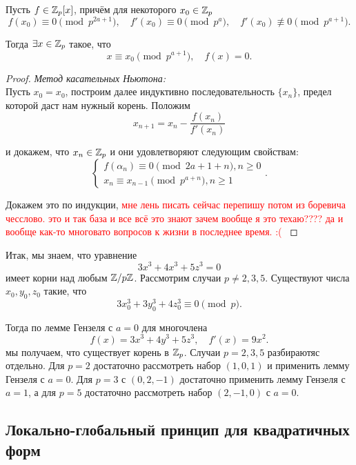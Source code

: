 	 \begin{lemma} 
	 	Пусть $f \in \mathbb{Z}_{p}[x]$, причём  для некоторого $x_0 \in \mathbb{Z}_{p}$
	 	\[
	 		f(x_0) \equiv 0 \pmod{p^{2a + 1}}, \quad f'(x_0) \equiv 0 \pmod{p^{a}}, \quad f'(x_0) \not\equiv 0 \pmod{p^{a + 1}}.
	 	\]

	 	Тогда $\exists x \in \mathbb{Z}_{p}$ такое, что \tabularnewline
	 	\[
	 		x \equiv x_0 \pmod{p^{a + 1}}, \quad f(x) = 0.
	 	\]
	 \end{lemma}

	 \begin{proof}
	 	\emph{Метод касательных Ньютона:}\\

	 	Пусть $x_0 = x_0$, построим далее индуктивно последовательность $\{x_n\}$, предел которой даст нам нужный корень. Положим  
	 	\[
	 		x_{n + 1} = x_n - \frac{f(x_n)}{f'(x_n)}
	 	\]

	 	и докажем, что $x_n \in \mathbb{Z}_{p}$ и они удовлетворяют следующим свойствам: 
	 	\[
	 		\begin{cases} f(\alpha_n) \equiv 0 \pmod{2a + 1 + n}, n \ge 0 \\ x_n \equiv x_{n - 1} \pmod{p^{a + n}}, n \ge 1 \end{cases}.
	 	\]

	 	Докажем это по индукции, \textcolor{red}{мне лень писать сейчас перепишу потом из боревича чесслово. это и так база и все всё это знают зачем вообще я это техаю???? да и вообще как-то многовато вопросов к жизни в последнее время. :( }
	 \end{proof}

	 Итак, мы знаем, что уравнение 
	 \[
	 	3x^3 + 4x^3 + 5z^3 = 0
	 \] 
	 имеет корни над любым $\mathbb{Z}/p\mathbb{Z}$.  Рассмотрим случаи $p \neq 2, 3, 5$. Существуют числа $x_0, y_0, z_0$ такие, что 
	 \[
	 	3x_0^3 + 3y_0^3 + 4 z_0^3 \equiv 0\pmod{p}.
	 \]

	 Тогда по лемме Гензеля с $a = 0$ для многочлена 
	 \[
	 	f(x) = 3x^3 + 4y^3 + 5z^3, \quad f'(x) = 9x^2.
	 \]
	 мы получаем, что существует корень в $\mathbb{Z}_{p}$.  Случаи $p = 2, 3, 5$ разбираютяс отдельно. Для $p = 2$ достаточно рассмотреть набор $(1, 0, 1)$ и применить лемму Гензеля с $a = 0$. Для $p = 3$ с $(0, 2, -1)$ достаточно применить лемму Гензеля с $a = 1$, а для $p = 5$ достаточно рассмотреть набор $(2, -1, 0)$ с $a = 0$. 

	 \subsection{Локально-глобальный принцип для квадратичных форм}

